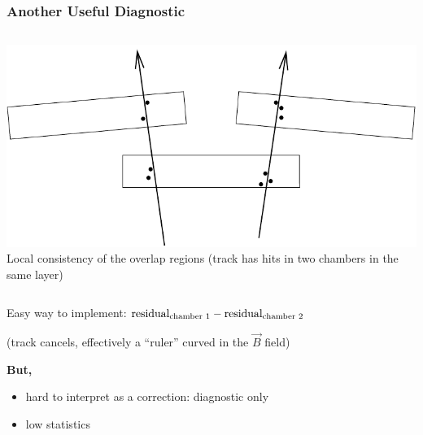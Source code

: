 \documentclass[12pt,compress]{beamer}
\begin{document}
\begin{frame}
\frametitle{Another Useful Diagnostic}
\begin{columns}
\includegraphics[width=\linewidth]{overlap_plots}
Local consistency of the overlap regions (track has hits in two
chambers in the same layer)
\end{columns}

\vfill Easy way to implement: $\mbox{residual}_{\mbox{\scriptsize chamber 1}} - \mbox{residual}_{\mbox{\scriptsize chamber 2}}$

\vfill (track cancels, effectively a ``ruler'' curved in the $\vec{B}$ field)

\vfill
{\bf But,}
\begin{itemize}
  \item hard to interpret as a correction: diagnostic only
  \item low statistics
\end{itemize}



\end{frame}
\end{document}
